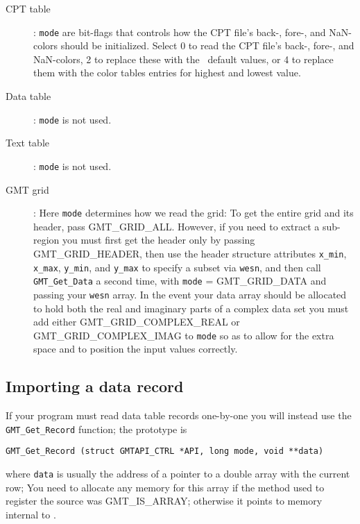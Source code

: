 \documentclass{report}
\begin{document}
\begin{description}
\item [CPT table]:  \texttt{mode} are bit-flags that controls how the CPT file's back-, fore-, and NaN-colors
should be initialized.  Select 0 to read the CPT file's back-, fore-, and NaN-colors, 2
to replace these with the \GMT\ default values, or 4 to replace them with the color tables
entries for highest and lowest value.
\item [Data table]:  \texttt{mode} is not used.
\item [Text table]:  \texttt{mode} is not used.
\item [GMT grid]:  Here \texttt{mode} determines how we read the grid:
To get the entire grid and its header, pass GMT\_GRID\_ALL.  However, if you
need to extract a sub-region you must first get the header only by passing
GMT\_GRID\_HEADER, then use the header structure attributes \texttt{x\_min},
\texttt{x\_max}, \texttt{y\_min}, and \texttt{y\_max} to specify a subset via \texttt{wesn}, and then call
\texttt{GMT\_Get\_Data} a second time, with \texttt{mode} = GMT\_GRID\_DATA and passing your \texttt{wesn} array.
In the event your data array should be allocated to hold both the real and imaginary parts of a
complex data set you must add either GMT\_GRID\_COMPLEX\_REAL or GMT\_GRID\_COMPLEX\_IMAG to \texttt{mode}
so as to allow for the extra space and to position the input values correctly.
\end{description}

\subsection{Importing a data record}

If your program must read data table records one-by-one you will instead use the
\texttt{GMT\_Get\_Record} function; the prototype is

\begin{verbatim}
GMT_Get_Record (struct GMTAPI_CTRL *API, long mode, void **data)
\end{verbatim}
where \texttt{data} is usually the address of a pointer to a double array with the current row;
You need to allocate any memory for this array if the method used to register
the source was GMT\_IS\_ARRAY; otherwise it points to memory internal to \GMT.
\end{document}
